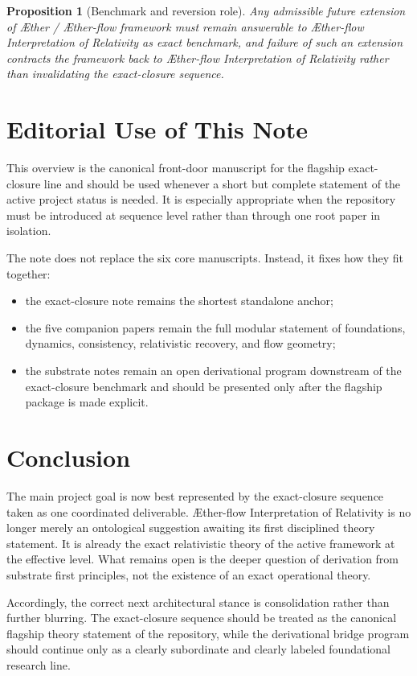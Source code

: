 \documentclass[11pt]{article}
\newcommand{\Aether}{\AE{}ther}
\newcommand{\Aflow}{\AE{}ther-flow}
\newcommand{\TheoryName}{\Aflow{} Interpretation of Relativity}
\newcommand{\TheoryProgram}{\Aether{} / \Aflow{} framework}
\newtheorem{proposition}{Proposition}
\begin{document}
\begin{proposition}[Benchmark and reversion role]
Any admissible future extension of \TheoryProgram{} must remain answerable to \TheoryName{} as exact benchmark, and failure of such an extension contracts the framework back to \TheoryName{} rather than invalidating the exact-closure sequence.
\end{proposition}

\section{Editorial Use of This Note}

This overview is the canonical front-door manuscript for the flagship exact-closure line and should be used whenever a short but complete statement of the active project status is needed. It is especially appropriate when the repository must be introduced at sequence level rather than through one root paper in isolation.

The note does not replace the six core manuscripts. Instead, it fixes how they fit together:
\begin{itemize}
    \item the exact-closure note remains the shortest standalone anchor;
    \item the five companion papers remain the full modular statement of foundations, dynamics, consistency, relativistic recovery, and flow geometry;
    \item the substrate notes remain an open derivational program downstream of the exact-closure benchmark and should be presented only after the flagship package is made explicit.
\end{itemize}

\section{Conclusion}

The main project goal is now best represented by the exact-closure sequence taken as one coordinated deliverable. \TheoryName{} is no longer merely an ontological suggestion awaiting its first disciplined theory statement. It is already the exact relativistic theory of the active framework at the effective level. What remains open is the deeper question of derivation from substrate first principles, not the existence of an exact operational theory.

Accordingly, the correct next architectural stance is consolidation rather than further blurring. The exact-closure sequence should be treated as the canonical flagship theory statement of the repository, while the derivational bridge program should continue only as a clearly subordinate and clearly labeled foundational research line.
\end{document}
